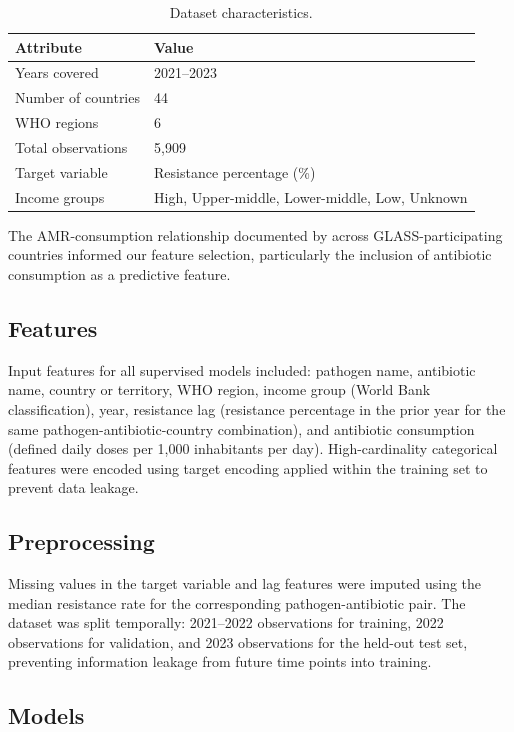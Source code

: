 \documentclass[12pt]{article}
\begin{document}
\begin{table}[H]
\centering
\caption{Dataset characteristics.}
\label{tab:dataset}
\begin{tabular}{ll}
\toprule
\textbf{Attribute} & \textbf{Value} \\
\midrule
Years covered & 2021--2023 \\
Number of countries & 44 \\
WHO regions & 6 \\
Total observations & 5,909 \\
Target variable & Resistance percentage (\%) \\
Income groups & High, Upper-middle, Lower-middle, Low, Unknown \\
\bottomrule
\end{tabular}
\end{table}

The AMR-consumption relationship documented by \citet{ajulo2024} across GLASS-participating countries informed our feature selection, particularly the inclusion of antibiotic consumption as a predictive feature.

\subsection{Features}

Input features for all supervised models included: pathogen name, antibiotic name, country or territory, WHO region, income group (World Bank classification), year, resistance lag (resistance percentage in the prior year for the same pathogen-antibiotic-country combination), and antibiotic consumption (defined daily doses per 1,000 inhabitants per day). High-cardinality categorical features were encoded using target encoding applied within the training set to prevent data leakage.

\subsection{Preprocessing}

Missing values in the target variable and lag features were imputed using the median resistance rate for the corresponding pathogen-antibiotic pair. The dataset was split temporally: 2021--2022 observations for training, 2022 observations for validation, and 2023 observations for the held-out test set, preventing information leakage from future time points into training.

\subsection{Models}
\end{document}
